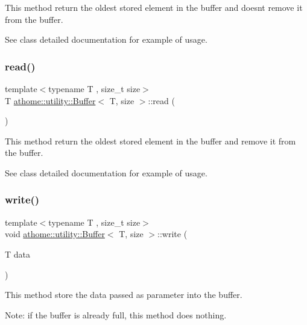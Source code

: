 This method return the oldest stored element in the buffer and doesn\textquotesingle{}t remove it from the buffer.

See class detailed documentation for example of usage. \mbox{\label{classathome_1_1utility_1_1_buffer_afc64f625641e7057b2a12dbf059cbd0c}} 
\subsubsection{\texorpdfstring{read()}{read()}}
{\footnotesize\ttfamily template$<$typename T , size\+\_\+t size$>$ \\
T \mbox{\hyperlink{classathome_1_1utility_1_1_buffer}{athome\+::utility\+::\+Buffer}}$<$ T, size $>$\+::read (\begin{DoxyParamCaption}{ }\end{DoxyParamCaption})\hspace{0.3cm}{\ttfamily [inline]}}

This method return the oldest stored element in the buffer and remove it from the buffer.

See class detailed documentation for example of usage. \mbox{\label{classathome_1_1utility_1_1_buffer_a49f31b68580136d5600491bd11b1e55f}} 
\subsubsection{\texorpdfstring{write()}{write()}}
{\footnotesize\ttfamily template$<$typename T , size\+\_\+t size$>$ \\
void \mbox{\hyperlink{classathome_1_1utility_1_1_buffer}{athome\+::utility\+::\+Buffer}}$<$ T, size $>$\+::write (\begin{DoxyParamCaption}\item[{T}]{data }\end{DoxyParamCaption})\hspace{0.3cm}{\ttfamily [inline]}}

This method store the data passed as parameter into the buffer.

Note\+: if the buffer is already full, this method does nothing.

